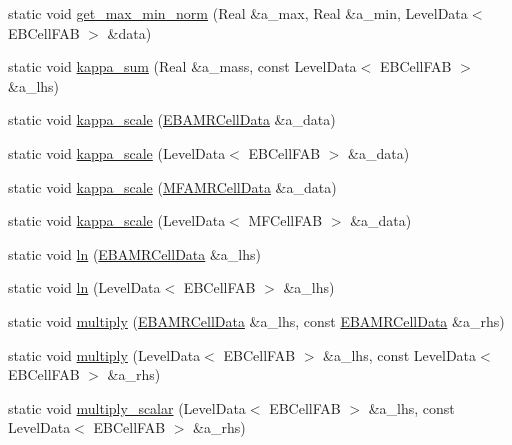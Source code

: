 \begin{DoxyCompactItemize}
\item 
static void \hyperlink{classdata__ops_a9784a1b6aa58c530bddf7265e0f20c09}{get\+\_\+max\+\_\+min\+\_\+norm} (Real \&a\+\_\+max, Real \&a\+\_\+min, Level\+Data$<$ E\+B\+Cell\+F\+AB $>$ \&data)
\item 
static void \hyperlink{classdata__ops_acc538ce1f7e0cb918caa1ebdcd5f0f83}{kappa\+\_\+sum} (Real \&a\+\_\+mass, const Level\+Data$<$ E\+B\+Cell\+F\+AB $>$ \&a\+\_\+lhs)
\item 
static void \hyperlink{classdata__ops_ad320629ff955b6214a18a2fcb456aaec}{kappa\+\_\+scale} (\hyperlink{type__definitions_8H_a7e610f301989e5e07781c5e338bdb7c3}{E\+B\+A\+M\+R\+Cell\+Data} \&a\+\_\+data)
\item 
static void \hyperlink{classdata__ops_a974a883854c31db5e5c3c57cc0362f2e}{kappa\+\_\+scale} (Level\+Data$<$ E\+B\+Cell\+F\+AB $>$ \&a\+\_\+data)
\item 
static void \hyperlink{classdata__ops_a3aaf8c0f82c33b1f86f57e0e63666f91}{kappa\+\_\+scale} (\hyperlink{type__definitions_8H_aced885351d40daa466564acbee4042d3}{M\+F\+A\+M\+R\+Cell\+Data} \&a\+\_\+data)
\item 
static void \hyperlink{classdata__ops_ad0e4f2caef4cdaa072d781041af06622}{kappa\+\_\+scale} (Level\+Data$<$ M\+F\+Cell\+F\+AB $>$ \&a\+\_\+data)
\item 
static void \hyperlink{classdata__ops_a9134650d2635299ed51607f1b7ea92cf}{ln} (\hyperlink{type__definitions_8H_a7e610f301989e5e07781c5e338bdb7c3}{E\+B\+A\+M\+R\+Cell\+Data} \&a\+\_\+lhs)
\item 
static void \hyperlink{classdata__ops_a03871d4fe4aebdb601928e63b009ff3a}{ln} (Level\+Data$<$ E\+B\+Cell\+F\+AB $>$ \&a\+\_\+lhs)
\item 
static void \hyperlink{classdata__ops_ad52530841cc78c62c53c12437eadba21}{multiply} (\hyperlink{type__definitions_8H_a7e610f301989e5e07781c5e338bdb7c3}{E\+B\+A\+M\+R\+Cell\+Data} \&a\+\_\+lhs, const \hyperlink{type__definitions_8H_a7e610f301989e5e07781c5e338bdb7c3}{E\+B\+A\+M\+R\+Cell\+Data} \&a\+\_\+rhs)
\item 
static void \hyperlink{classdata__ops_a13d54426b56f17689d9c0884762b9a59}{multiply} (Level\+Data$<$ E\+B\+Cell\+F\+AB $>$ \&a\+\_\+lhs, const Level\+Data$<$ E\+B\+Cell\+F\+AB $>$ \&a\+\_\+rhs)
\item 
static void \hyperlink{classdata__ops_a78780c6235ba82f7fa30283fb174ca2d}{multiply\+\_\+scalar} (Level\+Data$<$ E\+B\+Cell\+F\+AB $>$ \&a\+\_\+lhs, const Level\+Data$<$ E\+B\+Cell\+F\+AB $>$ \&a\+\_\+rhs)
\item 

\end{DoxyCompactItemize}
